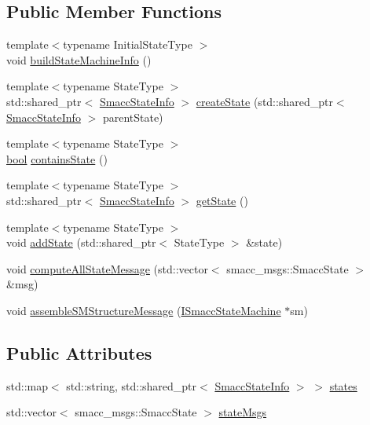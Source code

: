 \subsection*{Public Member Functions}
\begin{DoxyCompactItemize}
\item 
{\footnotesize template$<$typename Initial\+State\+Type $>$ }\\void \hyperlink{classsmacc_1_1SmaccStateMachineInfo_abef92b54a5e643232491db968de4aff0}{build\+State\+Machine\+Info} ()
\item 
{\footnotesize template$<$typename State\+Type $>$ }\\std\+::shared\+\_\+ptr$<$ \hyperlink{classsmacc_1_1SmaccStateInfo}{Smacc\+State\+Info} $>$ \hyperlink{classsmacc_1_1SmaccStateMachineInfo_a2d5759ccb5a8296debcc5dec741d3b42}{create\+State} (std\+::shared\+\_\+ptr$<$ \hyperlink{classsmacc_1_1SmaccStateInfo}{Smacc\+State\+Info} $>$ parent\+State)
\item 
{\footnotesize template$<$typename State\+Type $>$ }\\\hyperlink{classbool}{bool} \hyperlink{classsmacc_1_1SmaccStateMachineInfo_a416fe38639da791c2c77686988b545b0}{contains\+State} ()
\item 
{\footnotesize template$<$typename State\+Type $>$ }\\std\+::shared\+\_\+ptr$<$ \hyperlink{classsmacc_1_1SmaccStateInfo}{Smacc\+State\+Info} $>$ \hyperlink{classsmacc_1_1SmaccStateMachineInfo_a50cfbf5f500583054b98aaef7495bdb0}{get\+State} ()
\item 
{\footnotesize template$<$typename State\+Type $>$ }\\void \hyperlink{classsmacc_1_1SmaccStateMachineInfo_a188e81067d4a693ce479518dc87cf89b}{add\+State} (std\+::shared\+\_\+ptr$<$ State\+Type $>$ \&state)
\item 
void \hyperlink{classsmacc_1_1SmaccStateMachineInfo_afa2c7dbb9dd235d2e10f69691a035c1c}{compute\+All\+State\+Message} (std\+::vector$<$ smacc\+\_\+msgs\+::\+Smacc\+State $>$ \&msg)
\item 
void \hyperlink{classsmacc_1_1SmaccStateMachineInfo_a6758065a8d1faaa7c3688cf0dffe9334}{assemble\+S\+M\+Structure\+Message} (\hyperlink{classsmacc_1_1ISmaccStateMachine}{I\+Smacc\+State\+Machine} $\ast$sm)
\end{DoxyCompactItemize}
\subsection*{Public Attributes}
\begin{DoxyCompactItemize}
\item 
std\+::map$<$ std\+::string, std\+::shared\+\_\+ptr$<$ \hyperlink{classsmacc_1_1SmaccStateInfo}{Smacc\+State\+Info} $>$ $>$ \hyperlink{classsmacc_1_1SmaccStateMachineInfo_a8d6f1a9ce60f39835e7aa2179139977f}{states}
\item 
std\+::vector$<$ smacc\+\_\+msgs\+::\+Smacc\+State $>$ \hyperlink{classsmacc_1_1SmaccStateMachineInfo_aac401ecee7b25676a316e3dbdc680af8}{state\+Msgs}
\end{DoxyCompactItemize}


